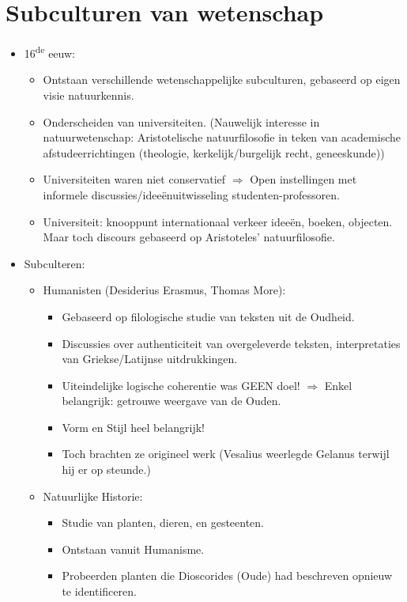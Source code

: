 \documentclass{article}
\begin{document}
  \section{Subculturen van wetenschap}
  \begin{itemize}
    \item 16\textsuperscript{de} eeuw:
    \begin{itemize}
      \item Ontstaan verschillende wetenschappelijke subculturen, gebaseerd op eigen visie natuurkennis.
      \item Onderscheiden van universiteiten. (Nauwelijk interesse in natuurwetenschap: Aristotelische natuurfilosofie in teken van academische afstudeerrichtingen (theologie, kerkelijk/burgelijk recht, geneeskunde))
      \item Universiteiten waren niet conservatief $\Rightarrow$ Open instellingen met informele discussies/idee\"enuitwisseling studenten-professoren.
      \item Universiteit: knooppunt internationaal verkeer idee\"en, boeken, objecten. Maar toch discours gebaseerd op Aristoteles' natuurfilosofie.
    \end{itemize}
    \item Subculteren:
    \begin{itemize}
      \item Humanisten (Desiderius Erasmus, Thomas More):
      \begin{itemize}
        \item Gebaseerd op filologische studie van teksten uit de Oudheid.
        \item Discussies over authenticiteit van overgeleverde teksten, interpretaties van Griekse/Latijnse uitdrukkingen.
        \item Uiteindelijke logische coherentie was GEEN doel! $\Rightarrow$ Enkel belangrijk: getrouwe weergave van de Ouden.
        \item Vorm en Stijl heel belangrijk!
        \item Toch brachten ze origineel werk (Vesalius weerlegde Gelanus terwijl hij er op steunde.)
      \end{itemize}
      \item Natuurlijke Historie:
      \begin{itemize}
        \item Studie van planten, dieren, en gesteenten.
        \item Ontstaan vanuit Humanisme.
        \item Probeerden planten die Dioscorides (Oude) had beschreven opnieuw te identificeren.

\end{itemize}
\end{itemize}
\end{itemize}
\end{document}
